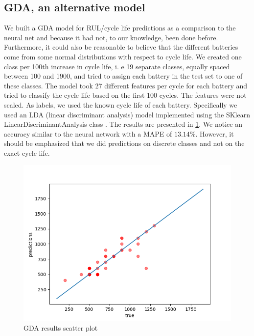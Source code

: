 \documentclass{article}
\begin{document}
\subsection{GDA, an alternative model}
We built a GDA model for RUL/cycle life predictions as a comparison to the neural net and because it had not, to our knowledge, been done before. Furthermore, it could also be reasonable to believe that the different batteries come from some normal distributions with respect to cycle life. We created one class per 100th increase in cycle life, i. e 19 separate classes, equally spaced between 100 and 1900, and tried to assign each battery in the test set to one of these classes. The model took 27 different features per cycle for each battery and tried to classify the cycle life based on the first 100 cycles. The features were not scaled. As labels, we used the known cycle life of each battery. Specifically we used an LDA (linear discriminant analysis) model implemented using the SKlearn LinearDiscriminantAnalysis class \cite{scikit-learn}. The results are presented in \ref{fig:GDA_scatter}. We notice an accuracy similar to the neural network with a MAPE of $13.14\%$. However, it should be emphasized that we did predictions on discrete classes and not on the exact cycle life.

\begin{figure}
    \centering
    \includegraphics[scale=0.6]{figs/GDA scatter plot.png}
    \caption{GDA results scatter plot}
    \label{fig:GDA_scatter}
\end{figure}


\end{document}
